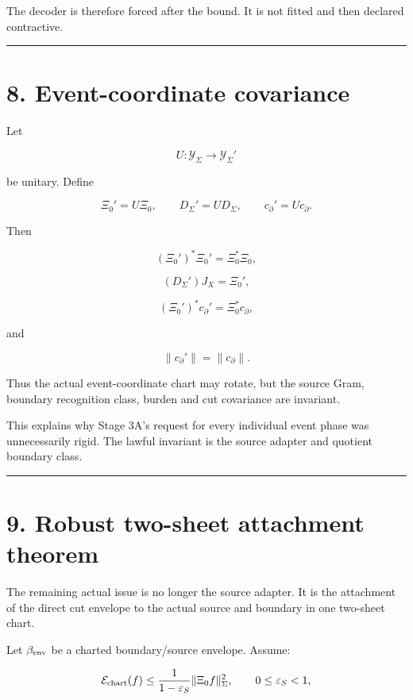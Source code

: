 The decoder is therefore forced after the bound. It is not fitted and then
declared contractive.

\begin{center}\rule{0.5\linewidth}{0.5pt}\end{center}

\hypertarget{event-coordinate-covariance}{%
\section{8. Event-coordinate covariance}\label{event-coordinate-covariance}}

Let

\[
U:\mathcal Y_\Sigma\to\mathcal Y_\Sigma'
\]

be unitary. Define

\[
\Xi_0'=U\Xi_0,
\qquad
D_\Sigma'=UD_\Sigma,
\qquad
c_\partial'=Uc_\partial.
\]

Then

\[
(\Xi_0')^*\Xi_0'=\Xi_0^*\Xi_0,
\]

\[
(D_\Sigma')J_X=\Xi_0',
\]

\[
(\Xi_0')^*c_\partial'=\Xi_0^*c_\partial,
\]

and

\[
\|c_\partial'\|=\|c_\partial\|.
\]

Thus the actual event-coordinate chart may rotate, but the source Gram,
boundary recognition class, burden and cut covariance are invariant.

This explains why Stage 3A's request for every individual event phase was
unnecessarily rigid. The lawful invariant is the source adapter and quotient
boundary class.

\begin{center}\rule{0.5\linewidth}{0.5pt}\end{center}

\hypertarget{robust-two-sheet-attachment-theorem}{%
\section{9. Robust two-sheet attachment theorem}\label{robust-two-sheet-attachment-theorem}}

The remaining actual issue is no longer the source adapter. It is the
attachment of the direct cut envelope to the actual source and boundary in one
two-sheet chart.

Let \(\beta_{\rm env}\) be a charted boundary/source envelope. Assume:

\[
\mathcal E_{\rm chart}(f)
\le
\frac{1}{1-\varepsilon_S}
\|\Xi_0f\|_\Sigma^2,
\qquad
0\le\varepsilon_S<1,
\]

